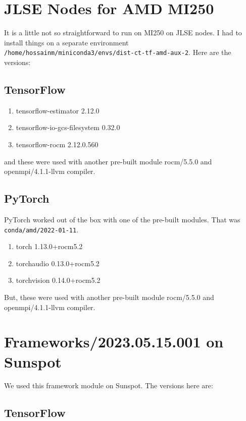 \documentclass{article}
\begin{document}
\section{JLSE Nodes for AMD MI250}
It is a little not so straightforward to run on MI250 on JLSE nodes. I had to
install things on a separate environment 
\verb|/home/hossainm/miniconda3/envs/dist-ct-tf-amd-aux-2|.
Here are the versions:

\subsection{TensorFlow}

\begin{enumerate}
\item tensorflow-estimator      2.12.0
\item tensorflow-io-gcs-filesystem 0.32.0
\item tensorflow-rocm           2.12.0.560
\end{enumerate}

and these were used with another pre-built module rocm/5.5.0 and 
openmpi/4.1.1-llvm compiler.


\subsection{PyTorch}
PyTorch worked out of the box with one of the pre-built modules. That was 
\verb|conda/amd/2022-01-11|.

\begin{enumerate}
\item torch                     1.13.0+rocm5.2
\item torchaudio                0.13.0+rocm5.2           
\item torchvision               0.14.0+rocm5.2 
\end{enumerate}

But, these were used with another pre-built module rocm/5.5.0 and 
openmpi/4.1.1-llvm compiler.

\section{Frameworks/2023.05.15.001 on Sunspot}
We used this framework module on Sunspot. The versions here are:

\subsection{TensorFlow}
\end{document}
